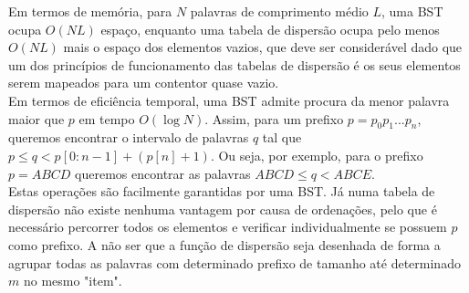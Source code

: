 \setcounter{chapter}{17}
Em termos de memória, para $N$ palavras de comprimento médio $L$, uma BST ocupa $O(NL)$ espaço, enquanto uma tabela de dispersão ocupa pelo menos $O(NL)$ mais o espaço dos elementos vazios, que deve ser considerável dado que um dos princípios de funcionamento das tabelas de dispersão é os seus elementos serem mapeados para um contentor quase vazio.\\
Em termos de eficiência temporal, uma BST admite procura da menor palavra maior que $p$ em tempo $O(\log N)$. Assim, para um prefixo $p=p_0 p_1 ... p_n$, queremos encontrar o intervalo de palavras $q$ tal que $p \leq q < p[0:n-1]+(p[n]+1)$. Ou seja, por exemplo, para o prefixo $p=ABCD$ queremos encontrar as palavras $ABCD \leq q < ABCE$.\\
Estas operações são facilmente garantidas por uma BST. Já numa tabela de dispersão não existe nenhuma vantagem por causa de ordenações, pelo que é necessário percorrer todos os elementos e verificar individualmente se possuem $p$ como prefixo. A não ser que a função de dispersão seja desenhada de forma a agrupar todas as palavras com determinado prefixo de tamanho até determinado $m$ no mesmo "item".
